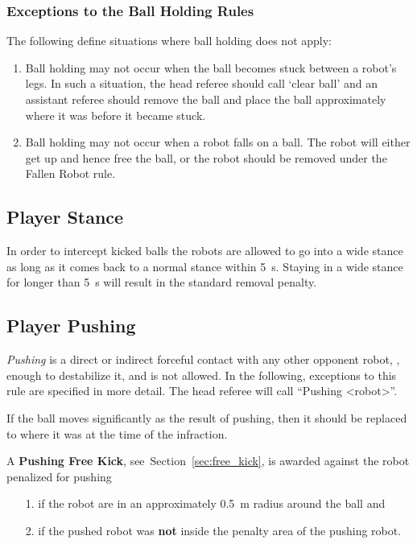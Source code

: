 \subsubsection{Exceptions to the Ball Holding Rules}
\label{sec:situations_no_ball_holding}

The following define situations where ball holding does not apply:

\begin{enumerate}
\item Ball holding may not occur when the ball becomes stuck between a robot's legs.  In such a situation, the head referee should call `clear ball' and an assistant referee should remove the ball and place the ball approximately where it was before it became stuck.
\item Ball holding may not occur when a robot falls on a ball.  The robot will either get up and hence free the ball, or the robot should be removed under the Fallen Robot rule.
\end{enumerate}

\subsection{Player Stance}
\label{sec:player_stance}

In order to intercept kicked balls the robots are allowed to go into a wide stance as long as it comes back to a normal stance within \qty{5}{\second}. Staying in a wide stance for longer than \qty{5}{\second} will result in the standard removal penalty.

\subsection{Player Pushing}
\label{sec:player_pushing}

\emph{Pushing} is a direct or indirect forceful contact with any other opponent robot, \ie, enough to destabilize it, and is not allowed. In the following, exceptions to this rule are specified in more detail.
The head referee will call ``Pushing \textless robot\textgreater''.

If the ball moves significantly as the result of pushing, then it should be replaced to where it was at the time of the infraction.

A \textbf{Pushing Free Kick}, see~Section~\ref{sec:free_kick}, is awarded against the robot penalized for pushing
\begin{itemize}
  \item[1.] if the robot are in an approximately \qty{0.5}{\metre} radius around the ball and
  \item[2.] if the pushed robot was \textbf{not} inside the penalty area of the pushing robot.
\end{itemize}


